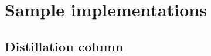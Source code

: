 \chapter{Sample implementations}

\begin{overview}
  
\end{overview}

\section{Distillation column}

